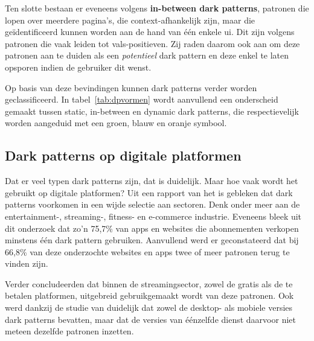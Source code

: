 Ten slotte bestaan er eveneens volgens \textcite{Chen2024, Chen2024a} \textbf{in-between dark patterns}, patronen die lopen over meerdere pagina's, die context-afhankelijk zijn, maar die geïdentificeerd kunnen worden aan de hand van één enkele \acrshort{ui}. Dit zijn volgens \textcite{Chen2024} patronen die vaak leiden tot vals-positieven. Zij raden daarom ook aan om deze patronen aan te duiden als een \textit{potentieel} dark pattern en deze enkel te laten opsporen indien de gebruiker dit wenst.

\vspace{1em}

Op basis van deze bevindingen kunnen dark patterns verder worden geclassificeerd. In tabel~\ref{tab:dpvormen} wordt aanvullend een onderscheid gemaakt tussen static, in-between en dynamic dark patterns, die respectievelijk worden aangeduid met een groen, blauw en oranje symbool.

\vspace{1em}


\subsection{Dark patterns op digitale platformen}
\label{subsec:platformen}

\vspace{1em}

Dat er veel typen dark patterns zijn, dat is duidelijk. Maar hoe vaak wordt het gebruikt op digitale platformen? Uit een rapport van het \textcite{ICPEN2024} is gebleken dat dark patterns voorkomen in een wijde selectie aan sectoren. Denk onder meer aan de entertainment-, streaming-, fitness- en e-commerce industrie. Eveneens bleek uit dit onderzoek dat zo’n 75,7\% van apps en websites die abonnementen verkopen minstens één dark pattern gebruiken. Aanvullend werd er geconstateerd dat bij 66,8\% van deze onderzochte websites en apps twee of meer patronen terug te vinden zijn. 

\vspace{1em}

Verder concludeerden \textcite{Nygren2024} dat binnen de streamingsector, zowel de gratis als de te betalen platformen, uitgebreid gebruikgemaakt wordt van deze patronen. Ook werd dankzij de studie van \textcite{Gunawan2021} duidelijk dat zowel de desktop- als mobiele versies dark patterns bevatten, maar dat de versies van éénzelfde dienst daarvoor niet meteen dezelfde patronen inzetten.

\vspace{1em}

